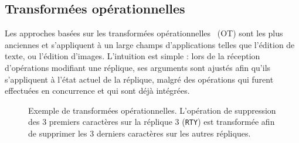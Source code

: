 

\subsection{Transformées opérationnelles}
\label{repl:subsec:ot}

Les approches basées sur les transformées
opérationnelles~\cite{sun1998operational, sun2009contextbased} (OT) sont les
plus anciennes et s'appliquent à un large champs d'applications telles que
l'édition de texte, ou l'édition d'images. L'intuition est simple : lors de la
réception d'opérations modifiant une réplique, ses arguments sont ajustés afin
qu'ils s'appliquent à l'état actuel de la réplique, malgré des opérations qui
furent effectuées en concurrence et qui sont déjà intégrées.

\begin{figure}
  \centering
  
  \caption[Exemple de transformées opérationnelles] {\label{repl:fig:otexample}
    Exemple de transformées opérationnelles. L'opération de suppression des 3
    premiers caractères sur la réplique 3 (\texttt{RTY}) est transformée afin de
    supprimer les 3 derniers caractères sur les autres répliques.}
\end{figure}

